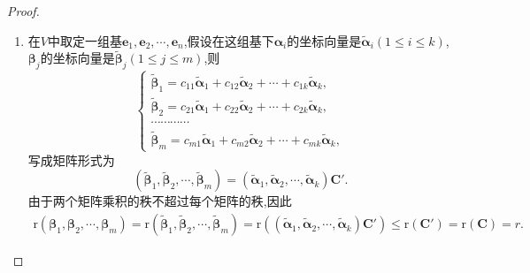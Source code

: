 \documentclass[lang=cn,newtx,10pt,scheme=chinese]{elegantbook}
\begin{document}
\begin{proof}
\begin{enumerate}[(1)]
    \item 在\(V\)中取定一组基\(\boldsymbol{e}_1,\boldsymbol{e}_2,\cdots,\boldsymbol{e}_n\),假设在这组基下\(\boldsymbol{\alpha}_i\)的坐标向量是\(\widetilde{\boldsymbol{\alpha}}_i(1\leq i\leq k)\),\(\boldsymbol{\beta}_j\)的坐标向量是\(\widetilde{\boldsymbol{\beta}}_j(1\leq j\leq m)\),则
    \[
    \begin{cases}
    \widetilde{\boldsymbol{\beta}}_1 = c_{11}\widetilde{\boldsymbol{\alpha}}_1 + c_{12}\widetilde{\boldsymbol{\alpha}}_2+\cdots + c_{1k}\widetilde{\boldsymbol{\alpha}}_k,\\
    \widetilde{\boldsymbol{\beta}}_2 = c_{21}\widetilde{\boldsymbol{\alpha}}_1 + c_{22}\widetilde{\boldsymbol{\alpha}}_2+\cdots + c_{2k}\widetilde{\boldsymbol{\alpha}}_k,\\
    \cdots\cdots\cdots\cdots\\
    \widetilde{\boldsymbol{\beta}}_m = c_{m1}\widetilde{\boldsymbol{\alpha}}_1 + c_{m2}\widetilde{\boldsymbol{\alpha}}_2+\cdots + c_{mk}\widetilde{\boldsymbol{\alpha}}_k,
    \end{cases}
    \]
    写成矩阵形式为
    \[
    (\widetilde{\boldsymbol{\beta}}_1,\widetilde{\boldsymbol{\beta}}_2,\cdots,\widetilde{\boldsymbol{\beta}}_m)=(\widetilde{\boldsymbol{\alpha}}_1,\widetilde{\boldsymbol{\alpha}}_2,\cdots,\widetilde{\boldsymbol{\alpha}}_k)\boldsymbol{C}'.
    \]
    由于两个矩阵乘积的秩不超过每个矩阵的秩,因此
    \begin{align*}
        \mathrm{r}\left( \boldsymbol{\beta }_1,\boldsymbol{\beta }_2,\cdots ,\boldsymbol{\beta }_m \right) =\mathrm{r}\left( \widetilde{\boldsymbol{\beta }}_1,\widetilde{\boldsymbol{\beta }}_2,\cdots ,\widetilde{\boldsymbol{\beta }}_m \right) =\mathrm{r}\left( \left( \widetilde{\boldsymbol{\alpha }}_1,\widetilde{\boldsymbol{\alpha }}_2,\cdots ,\widetilde{\boldsymbol{\alpha }}_k \right) \boldsymbol{C}' \right) \leqslant \mathrm{r}\left( \boldsymbol{C}'\right) =\mathrm{r}\left( \boldsymbol{C} \right) =r.
    \end{align*}
\end{enumerate}
\end{proof}
\end{document}
